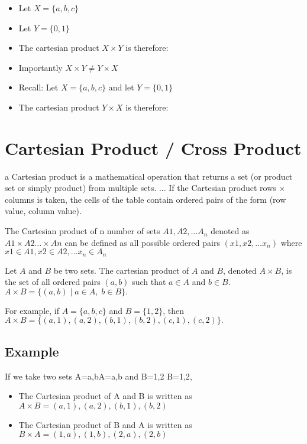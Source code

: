 \documentclass[12pt]{article}
\begin{document}
\begin{itemize}
\item Let $X = \{a,b,c\}$
\item Let $Y = \{0,1\}$ 
\item The cartesian product $X \times Y$ is therefore:
\end{itemize}

\begin{itemize}
\item Importantly $X \times Y \neq Y \times X$
\item Recall: Let $X = \{a,b,c\}$ and let $Y = \{0,1\}$ 
\item The cartesian product $Y \times X$ is therefore:
\end{itemize}


\section{Cartesian Product / Cross Product}
a Cartesian product is a mathematical operation that returns a set (or product set or simply product) from multiple sets. ... If the Cartesian product rows × columns is taken, the cells of the table contain ordered pairs of the form (row value, column value).

The Cartesian product of n number of sets $A1,A2,\ldots A_n$ denoted as $A1\times A2 \ldots \times An$ can be defined as all possible ordered pairs $(x1,x2,\ldots x_n)$
where $x1\in A1,x2\in A2,\ldots x_n \in A_n$

 Let $ A$ and $ B$ be two sets. The cartesian product of $ A$ and $ B$, denoted  $ A \times B$, is the set of all ordered pairs $ (a,b)$ such that $ a \in A$ and $ b \in B$.
$\displaystyle A \times B = \{ (a,b) \; \vert \; a \in A, \; b \in B \}.$   

For example, if  $ A=\{ a,b,c \}$ and  $ B= \{ 1,2 \}$, then
$\displaystyle A \times B = \{ (a,1), (a,2), (b,1), (b,2), (c,1), (c,2) \}.$

\subsection{Example}
If we take two sets A={a,b}A={a,b} and B={1,2}
B={1,2},

\begin{itemize}

\item The Cartesian product of A and B is written 
as  $A \times B={(a,1),(a,2),(b,1),(b,2)}$
\item The Cartesian product of B and A is written as  
$B\times A={(1,a),(1,b),(2,a),(2,b)}$
\end{itemize}
\end{document}
